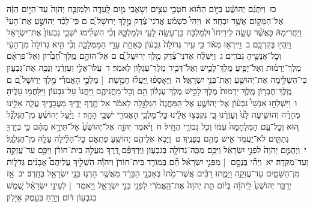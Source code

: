 \documentclass[18pt]{article}
\begin{document}
 {\loc כז~}וַיִּתְּנֵ֨ם יְהוֹשֻׁ֜עַ בַּיּ֣וֹם הַה֗וּא חֹטְבֵ֥י עֵצִ֛ים וְשֹׁ֥אֲבֵי מַ֖יִם לָֽעֵדָ֑ה וּלְמִזְבַּ֤ח יְהֹוָה֙ עַד־הַיּ֣וֹם הַזֶּ֔ה אֶל־הַמָּק֖וֹם אֲשֶׁ֥ר יִבְחָֽר׃ 
\startlock
 {\loc א~}וַיְהִי֩ כִשְׁמֹ֨עַ אֲדֹנִי־צֶ֜דֶק מֶ֣לֶךְ יְרוּשָׁל ַ֗͏ְם ם כִּֽי־לָכַ֨ד יְהוֹשֻׁ֣עַ אֶת־הָעַי֮ וַיַּחֲרִימָהּ֒ כַּאֲשֶׁ֨ר עָשָׂ֤ה לִֽירִיחוֹ֙ וּלְמַלְכָּ֔הּ כֵּן־עָשָׂ֥ה לָעַ֖י וּלְמַלְכָּ֑הּ וְכִ֨י הִשְׁלִ֜ימוּ יֹשְׁבֵ֤י גִבְעוֹן֙ אֶת־יִשְׂרָאֵ֔ל וַיִּֽהְי֖וּ בְּקִרְבָּֽם׃ \startlock
 {\loc ב~}וַיִּֽירְא֣וּ מְאֹ֔ד כִּ֣י עִ֤יר גְּדוֹלָה֙ גִּבְע֔וֹן כְּאַחַ֖ת עָרֵ֣י הַמַּמְלָכָ֑ה וְכִ֨י הִ֤יא גְדוֹלָה֙ מִן־הָעַ֔י וְכׇל־אֲנָשֶׁ֖יהָ גִּבֹּרִֽים׃ \startlock
 {\loc ג~}וַיִּשְׁלַ֨ח אֲדֹנִי־צֶ֜דֶק מֶ֣לֶךְ יְרוּשָׁל ַ֗͏ְם ם אֶל־הוֹהָ֣ם מֶֽלֶךְ־חֶ֠בְר֠וֹן וְאֶל־פִּרְאָ֨ם מֶלֶךְ־יַרְמ֜וּת וְאֶל־יָפִ֧יעַ מֶלֶךְ־לָכִ֛ישׁ וְאֶל־דְּבִ֥יר מֶלֶךְ־עֶגְל֖וֹן לֵאמֹֽר׃ \startlock
 {\loc ד~}עֲלוּ־אֵלַ֣י וְעִזְרֻ֔נִי וְנַכֶּ֖ה אֶת־גִּבְע֑וֹן כִּי־הִשְׁלִ֥ימָה אֶת־יְהוֹשֻׁ֖עַ וְאֶת־בְּנֵ֥י יִשְׂרָאֵֽל׃ \startlock
 {\loc ה~}וַיֵּאָסְפ֨וּ וַֽיַּעֲל֜וּ חֲמֵ֣שֶׁת  |  מַלְכֵ֣י הָאֱמֹרִ֗י מֶ֣לֶךְ יְרֽוּשָׁל ַ֜͏ְם ם מֶֽלֶךְ־חֶבְר֤וֹן מֶֽלֶךְ־יַרְמוּת֙ מֶלֶךְ־לָכִ֣ישׁ מֶלֶךְ־עֶגְל֔וֹן הֵ֖ם וְכׇל־מַחֲנֵיהֶ֑ם וַֽיַּחֲנוּ֙ עַל־גִּבְע֔וֹן וַיִּֽלָּחֲמ֖וּ עָלֶֽיהָ׃ \startlock
 {\loc ו~}וַיִּשְׁלְח֣וּ אַנְשֵׁי֩ גִבְע֨וֹן אֶל־יְהוֹשֻׁ֤עַ אֶל־הַֽמַּחֲנֶה֙ הַגִּלְגָּ֣לָה לֵאמֹ֔ר אַל־תֶּ֥רֶף יָדֶ֖יךָ מֵעֲבָדֶ֑יךָ עֲלֵ֧ה אֵלֵ֣ינוּ מְהֵרָ֗ה וְהוֹשִׁ֤יעָה לָּ֙נוּ֙ וְעׇזְרֵ֔נוּ כִּ֚י נִקְבְּצ֣וּ אֵלֵ֔ינוּ כׇּל־מַלְכֵ֥י הָאֱמֹרִ֖י יֹשְׁבֵ֥י הָהָֽר׃ \startlock
 {\loc ז~}וַיַּ֨עַל יְהוֹשֻׁ֜עַ מִן־הַגִּלְגָּ֗ל ה֚וּא וְכׇל־עַ֤ם הַמִּלְחָמָה֙ עִמּ֔וֹ וְכֹ֖ל גִּבּוֹרֵ֥י הֶחָֽיִל׃ \startlock
 {\loc ח~}וַיֹּ֨אמֶר יְהֹוָ֤ה אֶל־יְהוֹשֻׁ֙עַ֙ אַל־תִּירָ֣א מֵהֶ֔ם כִּ֥י בְיָדְךָ֖ נְתַתִּ֑ים לֹא־יַעֲמֹ֥ד אִ֛ישׁ מֵהֶ֖ם בְּפָנֶֽיךָ׃ \startlock
 {\loc ט~}וַיָּבֹ֧א אֲלֵיהֶ֛ם יְהוֹשֻׁ֖עַ פִּתְאֹ֑ם כׇּל־הַלַּ֕יְלָה עָלָ֖ה מִן־הַגִּלְגָּֽל׃ \startlock
 {\loc י~}וַיְהֻמֵּ֤ם יְהֹוָה֙ לִפְנֵ֣י יִשְׂרָאֵ֔ל וַיַּכֵּ֥ם מַכָּֽה־גְדוֹלָ֖ה בְּגִבְע֑וֹן וַֽיִּרְדְּפֵ֗ם דֶּ֚רֶךְ מַעֲלֵ֣ה בֵית־חוֹרֹ֔ן וַיַּכֵּ֥ם עַד־עֲזֵקָ֖ה וְעַד־מַקֵּדָֽה׃ \startlock
 {\loc יא~}וַיְהִ֞י בְּנֻסָ֣ם  |  מִפְּנֵ֣י יִשְׂרָאֵ֗ל הֵ֞ם בְּמוֹרַ֤ד בֵּית־חוֹרֹן֙ וַיהֹוָ֡ה הִשְׁלִ֣יךְ עֲלֵיהֶם֩ אֲבָנִ֨ים גְּדֹל֧וֹת מִן־הַשָּׁמַ֛יִם עַד־עֲזֵקָ֖ה וַיָּמֻ֑תוּ רַבִּ֗ים אֲשֶׁר־מֵ֙תוּ֙ בְּאַבְנֵ֣י הַבָּרָ֔ד מֵאֲשֶׁ֥ר הָרְג֛וּ בְּנֵ֥י יִשְׂרָאֵ֖ל בֶּחָֽרֶב׃ \startlock
 {\loc יב~}אָ֣ז יְדַבֵּ֤ר יְהוֹשֻׁעַ֙ לַֽיהֹוָ֔ה בְּי֗וֹם תֵּ֤ת יְהֹוָה֙ אֶת־הָ֣אֱמֹרִ֔י לִפְנֵ֖י בְּנֵ֣י יִשְׂרָאֵ֑ל וַיֹּ֣אמֶר  |  לְעֵינֵ֣י יִשְׂרָאֵ֗ל שֶׁ֚מֶשׁ בְּגִבְע֣וֹן דּ֔וֹם וְיָרֵ֖חַ בְּעֵ֥מֶק אַיָּלֽוֹן׃ \startlock
\end{document}
